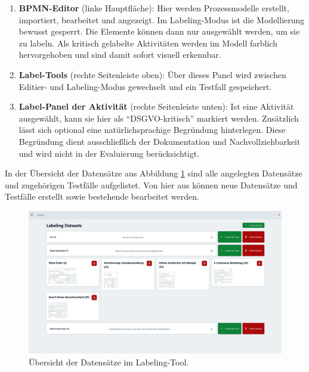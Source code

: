 \begin{enumerate}
    \item \textbf{BPMN-Editor} (linke Hauptfläche): Hier werden Prozessmodelle erstellt, importiert, bearbeitet und angezeigt. Im Labeling-Modus ist die Modellierung bewusst gesperrt. Die Elemente können dann nur ausgewählt werden, um sie zu labeln. Als kritisch gelabelte Aktivitäten werden im Modell farblich hervorgehoben und sind damit sofort visuell erkennbar.
    \item \textbf{Label-Tools} (rechte Seitenleiste oben): Über dieses Panel wird zwischen Editier- und Labeling-Modus gewechselt und ein Testfall gespeichert.
    \item \textbf{Label-Panel der Aktivität} (rechte Seitenleiste unten): Ist eine Aktivität ausgewählt, kann sie hier als \enquote{DSGVO-kritisch} markiert werden. Zusätzlich lässt sich optional eine natürlichsprachige Begründung hinterlegen. Diese Begründung dient ausschließlich der Dokumentation und Nachvollziehbarkeit und wird nicht in der Evaluierung berücksichtigt.
\end{enumerate}

In der Übersicht der Datensätze aus Abbildung \ref{fig:labeling-datasets} sind alle angelegten Datensätze und zugehörigen Testfälle aufgelistet. Von hier aus können neue Datensätze und Testfälle erstellt sowie bestehende bearbeitet werden.

\begin{figure}[h]
    \centering
    \includegraphics[width=\textwidth]{images/labeling/labeling-datasets}
    \caption{Übersicht der Datensätze im Labeling-Tool.}
    \label{fig:labeling-datasets}
\end{figure}